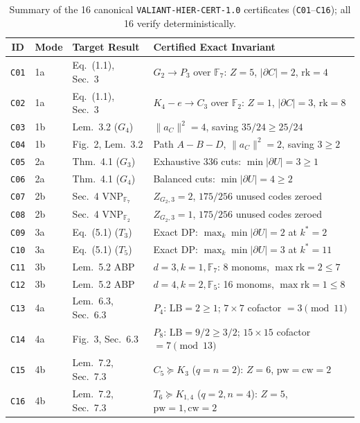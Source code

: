 \documentclass[10pt,twocolumn]{article}
\begin{document}
\begin{table}[t]
\centering
\tiny
\setlength{\tabcolsep}{3.1pt}
\caption{Summary of the 16 canonical \texttt{VALIANT-\allowbreak HIER-CERT-1.0} certificates (\texttt{C01}--\texttt{C16}); all 16 verify deterministically.}
\label{tab:corpus}
\begin{tabular}{@{}clll@{}}
\toprule
ID & Mode & Target Result & Certified Exact Invariant \\
\midrule
\texttt{C01} & 1a & Eq.~(1.1), Sec.~3 & $G_2\to P_3$ over $\mathbb{F}_7$: $Z{=}5$, $|\partial C|{=}2$, $\mathrm{rk}{=}4$ \\
\texttt{C02} & 1a & Eq.~(1.1), Sec.~3 & $K_4{-}e\to C_3$ over $\mathbb{F}_2$: $Z{=}1$, $|\partial C|{=}3$, $\mathrm{rk}{=}8$ \\
\texttt{C03} & 1b & Lem.~3.2 ($G_4$) & $\|a_C\|^2{=}4$, saving $35/24 \ge 25/24$ \\
\texttt{C04} & 1b & Fig.~2, Lem.~3.2 & Path $A{-}B{-}D$, $\|a_C\|^2{=}2$, saving $3 \ge 2$ \\
\texttt{C05} & 2a & Thm.~4.1 ($G_3$) & Exhaustive 336 cuts: $\min|\partial U|{=}3\ge 1$ \\
\texttt{C06} & 2a & Thm.~4.1 ($G_4$) & Balanced cuts: $\min|\partial U|{=}4\ge 2$ \\
\texttt{C07} & 2b & Sec.~4 $\mathrm{VNP}_{\mathbb{F}_7}$ & $Z_{G_2,3}{=}2$, $175/256$ unused codes zeroed \\
\texttt{C08} & 2b & Sec.~4 $\mathrm{VNP}_{\mathbb{F}_2}$ & $Z_{G_2,3}{=}1$, $175/256$ unused codes zeroed \\
\texttt{C09} & 3a & Eq.~(5.1) ($T_3$) & Exact DP: $\max_k\min|\partial U|{=}2$ at $k^*{=}2$ \\
\texttt{C10} & 3a & Eq.~(5.1) ($T_5$) & Exact DP: $\max_k\min|\partial U|{=}3$ at $k^*{=}11$ \\
\texttt{C11} & 3b & Lem.~5.2 ABP & $d{=}3, k{=}1, \mathbb{F}_7$: 8 monoms, $\max\mathrm{rk}{=}2\le 7$ \\
\texttt{C12} & 3b & Lem.~5.2 ABP & $d{=}4, k{=}2, \mathbb{F}_5$: 16 monoms, $\max\mathrm{rk}{=}1\le 8$ \\
\texttt{C13} & 4a & Lem.~6.3, Sec.~6.3 & $P_4$: $\mathrm{LB}{=}2\ge 1$; $7{\times}7$ cofactor $= 3\pmod{11}$ \\
\texttt{C14} & 4a & Fig.~3, Sec.~6.3 & $P_8$: $\mathrm{LB}{=}9/2\ge 3/2$; $15{\times}15$ cofactor $= 7\pmod{13}$ \\
\texttt{C15} & 4b & Lem.~7.2, Sec.~7.3 & $C_5\succeq K_3$ ($q{=}n{=}2$): $Z{=}6$, $\mathrm{pw}{=}\mathrm{cw}{=}2$ \\
\texttt{C16} & 4b & Lem.~7.2, Sec.~7.3 & $T_6\succeq K_{1,4}$ ($q{=}2,n{=}4$): $Z{=}5$, $\mathrm{pw}{=}1,\mathrm{cw}{=}2$ \\
\bottomrule
\end{tabular}
\end{table}
\end{document}
